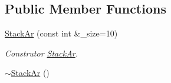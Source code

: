 \subsection*{Public Member Functions}
\begin{DoxyCompactItemize}
\item 
\hyperlink{class_stack_ar_ae1256302064835dbd36d078902670b5e}{Stack\+Ar} (const int \&\+\_\+size=10)
\begin{DoxyCompactList}\small\item\em Construtor \hyperlink{class_stack_ar}{Stack\+Ar}. \end{DoxyCompactList}\item 
\hyperlink{class_stack_ar_a4ad1d77653d6ebfbe03bb359f610863c}{$\sim$\+Stack\+Ar} ()\hypertarget{class_stack_ar_a4ad1d77653d6ebfbe03bb359f610863c}{}\label{class_stack_ar_a4ad1d77653d6ebfbe03bb359f610863c}


\end{DoxyCompactItemize}
